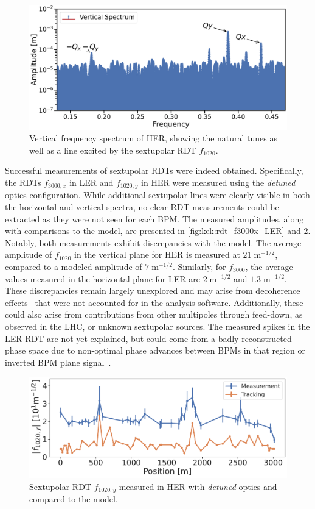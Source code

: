 \begin{figure}[!htb]
    \centering
    \includegraphics[width=0.8\linewidth]{images/kek/HER_2024-02-06_sextupoles_spectrum.pdf}
    \caption{Vertical frequency spectrum of HER, showing the natural tunes as well as a line
    excited by the sextupolar RDT $f_{1020}$.}
    \label{fig:kek:rdt_spectrum_HER}
\end{figure}

Successful measurements of sextupolar RDTs were indeed obtained. Specifically, the RDTs $f_{3000,x}$
in LER and $f_{1020,y}$ in HER were measured using the \textit{detuned} optics configuration. While
additional sextupolar lines were clearly visible in both the horizontal and vertical spectra, no
clear RDT measurements could be extracted as they were not seen for each BPM. The measured
amplitudes, along with comparisons to the model, are presented in \cref{fig:kek:rdt_f3000x_LER} and
\cref{fig:kek:rdt_f1020y_HER}. Notably, both measurements exhibit discrepancies with the model.  The
average amplitude of $f_{1020}$ in the vertical plane for HER is measured at $21\;\text{m}^{-1/2}$, 
compared to a modeled amplitude of $7\;\text{m}^{-1/2}$. Similarly, for $f_{3000}$, the average
values measured in the horizontal plane for LER are $2\;\text{m}^{-1/2}$ and $1.3\;\text{m}^{-1/2}$.
These discrepancies remain largely unexplored and may arise from decoherence
effects~\cite{tomas_direct_2003} that were not accounted for in the analysis software. 
Additionally, these could also arise from contributions from other multipoles through feed-down, as
observed in the LHC, or unknown sextupolar sources. The measured spikes in the LER RDT are not yet 
explained, but could come from a badly reconstructed phase space due to non-optimal phase advances 
between BPMs in that region or inverted BPM plane signal~\cite{frank2024private}.

\begin{figure}[!htb]
    \centering
    \includegraphics[width=0.8\linewidth]{images/kek/f1020y_HER.pdf}
    \caption{Sextupolar RDT $f_{1020,y}$ measured in HER with \textit{detuned} optics and compared to 
    the model.}
    \label{fig:kek:rdt_f1020y_HER}
\end{figure}

